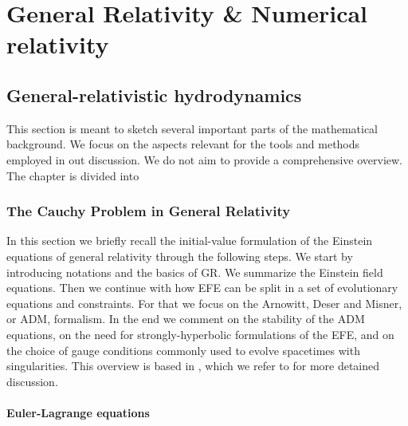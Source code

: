 
\chapter{General Relativity \& Numerical relativity}
\label{app:gr}


\section{General-relativistic hydrodynamics}



This section is meant to sketch several important parts of the mathematical background. 
We focus on the aspects relevant for the tools and methods employed in out discussion. 
We do not aim to provide a comprehensive overview. 
The chapter is divided into 



\subsection{The Cauchy Problem in General Relativity}


In this section we briefly recall the initial-value formulation of the Einstein equations of general relativity through the following steps. 
We start by introducing notations and the basics of GR. 
We summarize the Einstein field equations. 
Then we continue with how EFE can be split in a set of evolutionary equations and constraints. 
For that we focus on the Arnowitt, Deser and Misner, or ADM, formalism. 
In the end we comment on the stability of the ADM equations, on the need for strongly-hyperbolic formulations of the EFE, and on the choice of gauge conditions commonly used to evolve spacetimes with singularities. 
This overview is based in \cite{Arnowitt:1962hi,Landau:1982dva,Wald:1984,Misner:1973,Baumgarte:2002jm}, which we refer to for more detained discussion.

\subsubsection{Euler-Lagrange equations}

